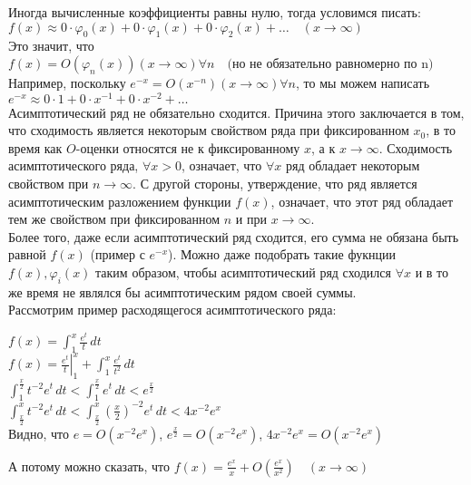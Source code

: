 \documentclass{report}
\begin{document}
Иногда вычисленные коэффициенты равны нулю, тогда условимся писать: \\
$f(x)\approx 0\cdot\varphi_0(x)+0\cdot\varphi_1(x)+0\cdot\varphi_2(x)+\dots\quad(x\to\infty)$ \\
Это значит, что $f(x)=O(\varphi_n(x))(x\to\infty)\forall n\quad\textrm{(но не обязательно равномерно по n)}$ \\
Например, поскольку $e^{-x}=O(x^{-n})(x\to\infty)\forall n$, то мы можем написать \\
$e^{-x}\approx0\cdot{1}+0\cdot{x^{-1}}+0\cdot{x^{-2}}+\dots$ \\
Асимптотический ряд не обязательно сходится. Причина этого заключается в том, что сходимость является некоторым свойством ряда при фиксированном $x_0$,
в то время как $O$-оценки относятся не к фиксированному $x$, а к $x\to\infty$. Сходимость асимптотического ряда, $\forall{x>0}$, означает, что $\forall{x}$
ряд обладает некоторым свойством при $n\to\infty$. С другой стороны, утверждение, что ряд является асимптотическим разложением функции $f(x)$, означает, что
этот ряд обладает тем же свойством при фиксированном $n$ и при $x\to\infty$. \\
Более того, даже если асимптотический ряд сходится, его сумма не обязана быть равной $f(x)$ (пример с $e^{-x}$). Можно даже подобрать такие фукнции $f(x),\varphi_i(x)$
таким образом, чтобы асимптотический ряд сходился $\forall{x}$ и в то же время не являлся бы асимптотическим рядом своей суммы. \\
Рассмотрим пример расходящегося асимптотического ряда: \\
\begin{center}
$f(x)=\int_{1}^{x}\frac{e^{t}}{t}\,dt$ \\
$f(x)=\left.\frac{e^{t}}{t}\right\vert_{1}^{x}+\int_{1}^{x}\frac{e^{t}}{t^{2}}\,dt$ \\
$\int_{1}^{\frac{x}{2}}t^{-2}e^{t}\,dt<\int_{1}^{\frac{x}{2}}e^{t}\,dt<e^{\frac{x}{2}}$ \\
$\int_{\frac{x}{2}}^{x}t^{-2}e^{t}\,dt<\int_{\frac{x}{2}}^{x}{\left(\frac{x}{2}\right)}^{-2}e^{t}\,dt<4x^{-2}e^{x}$ \\
Видно, что $e=O(x^{-2}e^{x})$, $e^{\frac{x}{2}}=O(x^{-2}e^{x})$, $4x^{-2}e^{x}=O(x^{-2}e^{x})$
А потому можно сказать, что $f(x)=\frac{e^{x}}{x}+O\left(\frac{e^{x}}{x^{2}}\right)\quad(x\to\infty)$ \\
\end{center}
\end{document}
